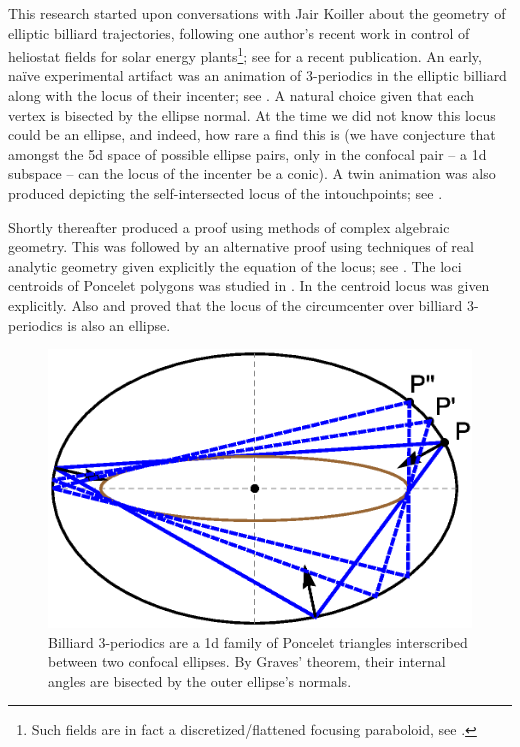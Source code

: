 This research started upon conversations with Jair Koiller about the geometry of elliptic billiard trajectories, following one author's recent work in control of heliostat fields for solar energy plants\footnote{Such fields are in fact a discretized/flattened focusing paraboloid, see \cite{sundrop2016,esolar2017}.}; see \cite{gross2020-solar} for a recent publication. An early, naïve experimental artifact was an animation of 3-periodics in the elliptic billiard along with the locus of their incenter; see  \cite{dsr_vid11incenter}. A natural choice given that each vertex is bisected by the ellipse normal. At the time we did not know this locus could be an ellipse, and indeed, how rare a find this is (we have conjecture that amongst the 5d space of possible ellipse pairs, only in the confocal pair -- a 1d subspace -- can the locus of the incenter be a conic). A twin animation was also produced depicting the self-intersected locus of the intouchpoints; see \cite{dsr_vid11e}.

Shortly thereafter \cite{olga14} produced a proof using methods of complex algebraic geometry.
This was followed by an alternative    proof using techniques of real analytic   geometry given explicitly the equation of the locus; see \cite{garcia2019-incenter}. The loci centroids of Poncelet polygons was studied in \cite{schwartz2016-com}. In  \cite{garcia2019-incenter} the centroid locus was given explicitly.  Also \cite{corentin2021-circum} and \cite{garcia2018} proved that the locus of the circumcenter over billiard 3-periodics is also an ellipse.

\begin{figure}[H]
    \centering
    \includegraphics[width=.7\textwidth]{chap_01/pics/pics_01_030_three_orbits.eps}
    \caption{Billiard 3-periodics are a 1d family of Poncelet triangles interscribed between two confocal ellipses. By Graves' theorem, their internal angles are bisected by the outer ellipse's normals.}
    \label{fig:01-three-orbits-proof}
\end{figure}


